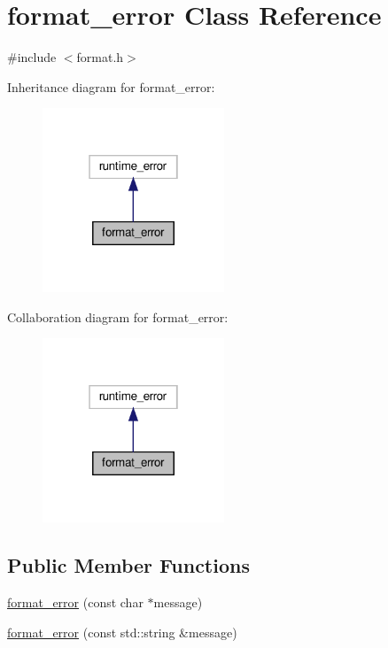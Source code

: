 \hypertarget{classformat__error}{}\section{format\+\_\+error Class Reference}
\label{classformat__error}


{\ttfamily \#include $<$format.\+h$>$}



Inheritance diagram for format\+\_\+error\+:
\nopagebreak
\begin{figure}[H]
\begin{center}
\leavevmode
\includegraphics[width=154pt]{classformat__error__inherit__graph}
\end{center}
\end{figure}


Collaboration diagram for format\+\_\+error\+:
\nopagebreak
\begin{figure}[H]
\begin{center}
\leavevmode
\includegraphics[width=154pt]{classformat__error__coll__graph}
\end{center}
\end{figure}
\subsection*{Public Member Functions}
\begin{DoxyCompactItemize}
\item 
\hyperlink{classformat__error_adfdc5b92749dc5f436e456bb5393d689}{format\+\_\+error} (const char $\ast$message)
\item 
\hyperlink{classformat__error_aec9d9c4e34320e130463abaf4dc4f200}{format\+\_\+error} (const std\+::string \&message)
\end{DoxyCompactItemize}


